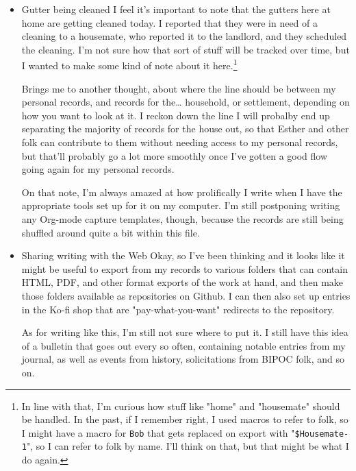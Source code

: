 \documentclass[11pt]{article}
\begin{document}
\begin{itemize}
But: the important thing for my immediate needs is to know that I needed to take 3 gallons of water from colonialism, and so regardless of how much water that actually is behind the scenes, 3 gallons of water is what I need to work to replace.
\item Gutter being cleaned
\label{sec:orgd2c215b}
I feel it's important to note that the gutters here at home are getting cleaned today. I reported that they were in need of a cleaning to a housemate, who reported it to the landlord, and they scheduled the cleaning. I'm not sure how that sort of stuff will be tracked over time, but I wanted to make some kind of note about it here.\footnote{In line with that, I'm curious how stuff like "home" and "housemate" should be handled. In the past, if I remember right, I used macros to refer to folk, so I might have a macro for \texttt{Bob} that gets replaced on export with "\texttt{\$Housemate-1}", so I can refer to folk by name. I'll think on that, but that might be what I do again.}

Brings me to another thought, about where the line should be between my personal records, and records for the\ldots{} household, or settlement, depending on how you want to look at it. I reckon down the line I will probalby end up separating the majority of records for the house out, so that Esther and other folk can contribute to them without needing access to my personal records, but that'll probably go a lot more smoothly once I've gotten a good flow going again for my personal records.

On that note, I'm always amazed at how prolifically I write when I have the appropriate tools set up for it on my computer. I'm still postponing writing any Org-mode capture templates, though, because the records are still being shuffled around quite a bit within this file.
\item Sharing writing with the Web
\label{sec:org764fc79}
Okay, so I've been thinking and it looks like it might be useful to export from my records to various folders that can contain HTML, PDF, and other format exports of the work at hand, and then make those folders available as repositories on Github. I can then also set up entries in the Ko-fi shop that are "pay-what-you-want" redirects to the repository.

As for writing like this, I'm still not sure where to put it. I still have this idea of a bulletin that goes out every so often, containing notable entries from my journal, as well as events from history, solicitations from BIPOC folk, and so on.


\end{itemize}
\end{document}
